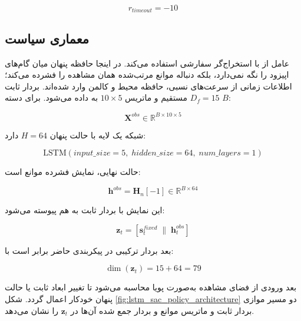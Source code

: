 \begin{equation}
	r_{timeout}=-10
	\label{eq:timeout_penalty_final}
\end{equation}

\subsection{معماری سیاست }
\label{subsec:lstm_sac_architecture_final}

عامل از  با استخراج‌گر سفارشی  استفاده می‌کند.  در اینجا حافظه پنهان میان گام‌های اپیزود را نگه نمی‌دارد، بلکه دنباله موانع مرتب‌شده همان مشاهده را فشرده می‌کند؛ اطلاعات زمانی از سرعت‌های نسبی، حافظه محیط و کالمن وارد شده‌اند. بردار ثابت \(D_f=15\) مستقیم و ماتریس \(10\times5\) به  داده می‌شود. برای دسته \(B\):

\begin{equation}
	\mathbf{X}^{obs}\in\mathbb{R}^{B\times 10\times 5}
	\label{eq:lstm_input_shape_final}
\end{equation}

شبکه یک لایه با حالت پنهان \(H=64\) دارد:

\begin{equation}
	\mathrm{LSTM}(input\_size=5,\;hidden\_size=64,\;num\_layers=1)
	\label{eq:lstm_config_final}
\end{equation}

حالت نهایی، نمایش فشرده موانع است:

\begin{equation}
	\mathbf{h}^{obs}=\mathbf{H}_{n}[-1]\in\mathbb{R}^{B\times64}
	\label{eq:lstm_last_hidden_final}
\end{equation}

این نمایش با بردار ثابت به هم پیوسته می‌شود:

\begin{equation}
	\mathbf{z}_t=\left[\mathbf{s}^{fixed}_t\;\|\;\mathbf{h}^{obs}_t\right]
	\label{eq:feature_concat_final}
\end{equation}

بعد بردار ترکیبی در پیکربندی حاضر برابر است با:

\begin{equation}
	\dim(\mathbf{z}_t)=15+64=79
	\label{eq:combined_feature_dim_final}
\end{equation}

بعد ورودی از فضای مشاهده به‌صورت پویا محاسبه می‌شود تا تغییر ابعاد ثابت یا حالت پنهان خودکار اعمال گردد. شکل \ref{fig:lstm_sac_policy_architecture} دو مسیر موازی بردار ثابت و ماتریس موانع و بردار جمع شده آن‌ها در \(\mathbf{z}_t\) را نشان می‌دهد.

